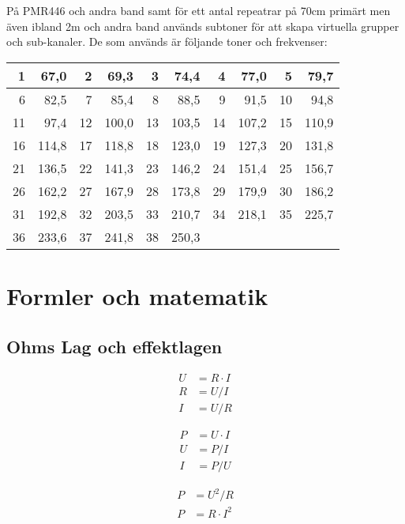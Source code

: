 \documentclass[12pt,swedish,a4paper]{article}
\begin{document}
På PMR446 och andra band samt för ett antal repeatrar på 70cm primärt men även ibland 2m och andra band används subtoner för att skapa virtuella grupper och sub-kanaler. De som används är följande toner och frekvenser:

\begin{tabular}{rr|rr|rr|rr|rr}
	 1 &  67,0 &  2 &  69,3 &  3 &  74,4 &  4 &  77,0 &  5 &  79,7 \\ \hline
	 6 &  82,5 &  7 &  85,4 &  8 &  88,5 &  9 &  91,5 & 10 &  94,8 \\ \hline
	11 &  97,4 & 12 & 100,0 & 13 & 103,5 & 14 & 107,2 & 15 & 110,9 \\ \hline
	16 & 114,8 & 17 & 118,8 & 18 & 123,0 & 19 & 127,3 & 20 & 131,8 \\ \hline
	21 & 136,5 & 22 & 141,3 & 23 & 146,2 & 24 & 151,4 & 25 & 156,7 \\ \hline
	26 & 162,2 & 27 & 167,9 & 28 & 173,8 & 29 & 179,9 & 30 & 186,2 \\ \hline
	31 & 192,8 & 32 & 203,5 & 33 & 210,7 & 34 & 218,1 & 35 & 225,7 \\ \hline
	36 & 233,6 & 37 & 241,8 & 38 & 250,3 &    &       &    &
\end{tabular}














\section{Formler och matematik}

\subsection{Ohms Lag och effektlagen}

\begin{align}
U &= R\cdot I\\
R &= U/I\\
I &= U/R
\end{align}

\begin{align}
P &= U \cdot I\\
U &= P/I\\
I &= P/U
\end{align}

\begin{align}
P &= U^2/R\\
P &= R \cdot I^2
\end{align}
\end{document}
